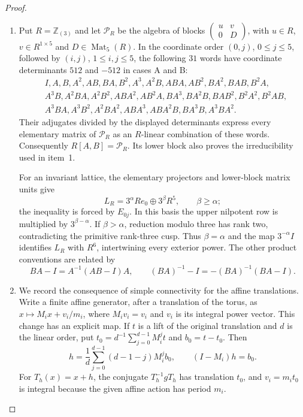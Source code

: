 \documentclass[11pt,a4paper]{article}
\numberwithin{equation}{section}
\theoremstyle{definition}
\begin{document}
\begin{proof}
\begin{enumerate}[label=\arabic*.]
\item Put $R=\mathbb Z_{(3)}$ and let $\mathcal P_R$ be the algebra
of blocks $\left(\begin{smallmatrix}u&v\\0&D\end{smallmatrix}\right)$,
with $u\in R$, $v\in R^{1\times5}$ and $D\in\operatorname{Mat}_5(R)$.
In the coordinate order $(0,j)$, $0\leq j\leq5$, followed by
$(i,j)$, $1\leq i,j\leq5$, the following $31$ words have coordinate
determinants $512$ and $-512$ in cases A and B:
\[
\begin{aligned}
&I,A,B,A^2,AB,BA,B^2,A^3,A^2B,ABA,AB^2,BA^2,BAB,B^2A,\\
&A^3B,A^2BA,A^2B^2,ABA^2,AB^2A,BA^3,BA^2B,BAB^2,B^2A^2,B^2AB,\\
&A^3BA,A^3B^2,A^2BA^2,ABA^3,ABA^2B,BA^3B,A^3BA^2.
\end{aligned}
\]
Their adjugates divided by the displayed determinants express
every elementary matrix of $\mathcal P_R$ as an $R$-linear
combination of these words.  Consequently $R[A,B]=\mathcal P_R$.
Its lower block also proves the irreducibility used in item~1.

For an invariant lattice, the elementary projectors and lower-block
matrix units give
\[
 L_R=3^\alpha Re_0\oplus3^\beta R^5,\qquad \beta\geq\alpha;
\]
the inequality is forced by $E_{0j}$.  In this basis the upper
nilpotent row is multiplied by $3^{\beta-\alpha}$.  If
$\beta>\alpha$, reduction modulo three has rank two, contradicting
the primitive rank-three cusp.  Thus $\beta=\alpha$ and the map $3^{-\alpha}I$ identifies $L_R$ with $R^6$, intertwining every
exterior power.  The other product conventions are related by
\[
 BA-I=A^{-1}(AB-I)A,\qquad
 (BA)^{-1}-I=-(BA)^{-1}(BA-I).
\]

\item We record the consequence of simple connectivity for the
affine translations.  Write a finite affine generator,
after a translation of the torus, as
$x\mapsto M_ix+v_i/m_i$, where $M_iv_i=v_i$ and $v_i$ is its
integral power vector.  This change has an explicit map.  If $t$
is a lift of the original translation and $d$ is the linear order,
put $t_0=d^{-1}\sum_{j=0}^{d-1}M_i^jt$ and $b_0=t-t_0$.
Then
\[
 h=\frac1d\sum_{j=0}^{d-1}(d-1-j)M_i^jb_0,
 \qquad (I-M_i)h=b_0.
\]
For $T_h(x)=x+h$, the conjugate $T_h^{-1}gT_h$ has translation $t_0$, and
$v_i=m_it_0$ is integral because the given affine action has
period $m_i$.


\end{enumerate}
\end{proof}
\end{document}
